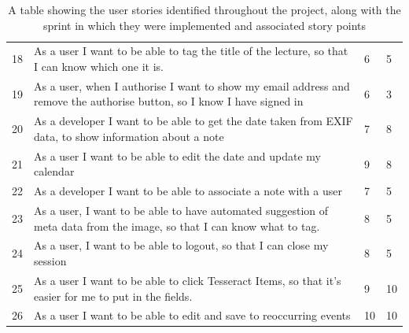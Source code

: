 \begin{table}[h!]
\begin{tabular}{|p{1cm} p{10cm} p{1cm} p{1cm}|}
 18&As a user I want to be able to tag the title of the lecture, so that I can know which one it is.&6&5 \\
 19&As a user, when I authorise I want to show my email address and remove the authorise button, so I know I have signed in&6&3 \\
 20&As a developer I want to be able to get the date taken from EXIF data, to show information about a note&7&8 \\
 21&As a user I want to be able to edit the date and update my calendar&9&8 \\
 22&As a developer I want to be able to associate a note with a user&7&5 \\
 23&As a user, I want to be able to have automated suggestion of meta data from the image, so that I can know what to tag.&8&5 \\
 24&As a user, I want to be able to logout, so that I can close my session&8&5 \\
 25&As a user I want to be able to click Tesseract Items, so that it's easier for me to put in the fields.&9&10 \\
 26&As a user I want to be able to edit and save to reoccurring events&10&10 \\
 \hline
 \end{tabular}
 \caption{A table showing the user stories identified throughout the project, along with the sprint in which they were implemented and associated story points}
\end{table}
